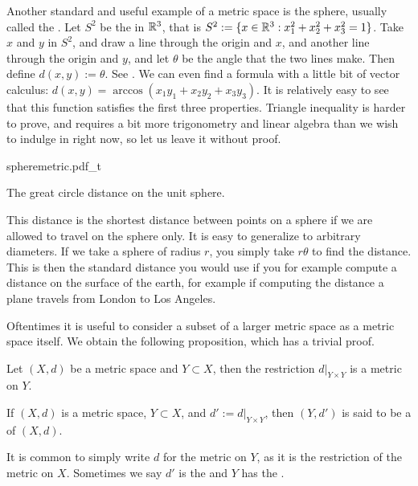 \begin{example}
Another standard and useful example of a metric space is the sphere,
usually called the \emph{}.
Let $S^2$ be the  in ${\mathbb{R}}^3$,
that is $S^2 := \{ x \in {\mathbb{R}}^3 : x_1^2+x_2^2+x_3^2 = 1 \}$.
Take $x$ and $y$ in $S^2$, and draw a line through the origin and $x$,
and another line through the origin and $y$,
and let $\theta$ be the angle that the two lines make.
Then define $d(x,y) := \theta$.  See .
We can even find a formula with a little bit of vector calculus:
$d(x,y) = \arccos(x_1y_1+x_2y_2+x_3y_3)$.
It is relatively easy to see that this function satisfies the first three
properties.  Triangle inequality is harder to prove, and requires a bit more
trigonometry and linear algebra than we wish to indulge in right now, so let
us leave it without proof.

\begin{myfigureht}
{spheremetric.pdf_t}
\caption{The great circle distance on the unit
sphere.\label{fig:spheremetric}}
\end{myfigureht}

This distance is the shortest distance between points on a sphere if
we are allowed to travel on the sphere only.  It is easy to
generalize to arbitrary diameters.  If we take a sphere of radius
$r$, you simply take $r \theta$ to find the distance.  This is then the
standard distance you would use if you for example compute a distance on the
surface of the earth, for example if computing the distance a plane travels from London to
Los Angeles.
\end{example}

Oftentimes it is useful to consider a subset of a larger metric space
as a metric space itself.  We obtain the following proposition, which has
a trivial proof.

\begin{prop}
Let $(X,d)$ be a metric space and $Y \subset X$, then the restriction
$d|_{Y \times Y}$ is a metric on $Y$.
\end{prop}

\begin{defn}
If $(X,d)$ is a metric space, $Y \subset X$, and $d' := d|_{Y \times Y}$,
then $(Y,d')$ is said to be a \emph{} of $(X,d)$.
\end{defn}

It is common to simply write $d$ for the metric on $Y$, as it is 
the restriction of the metric on $X$.  Sometimes we say $d'$ is
the \emph{} and $Y$ has the
\emph{}.

